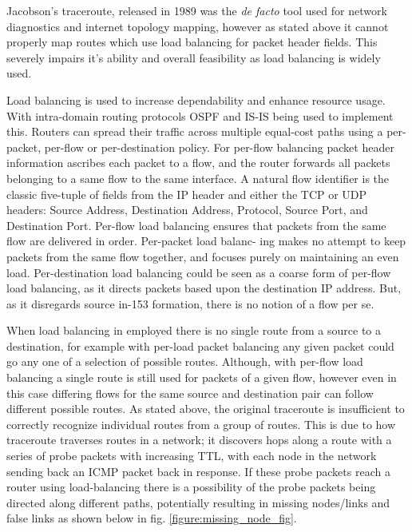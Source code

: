 Jacobson's traceroute, released in 1989 was the \textit{de facto} tool used for network diagnostics and internet topology mapping, however as stated above it cannot properly map routes which use load balancing for packet header fields. This severely impairs it's ability and overall feasibility as load balancing is widely used.

Load balancing is used to increase dependability and enhance resource usage. With intra-domain routing protocols OSPF\cite{moyospf} and IS-IS\cite{isis} being used to implement this. Routers can spread their traffic across multiple equal-cost paths using a per-packet, per-flow or per-destination policy. \cite{cisco}\cite{juniper} For per-flow balancing packet header information ascribes each packet to a flow, and the router forwards all packets belonging to a same flow to the same interface. A natural flow identifier is the classic five-tuple of fields from
the IP header and either the TCP or UDP headers: Source
Address, Destination Address, Protocol, Source Port, and
Destination Port. Per-flow load balancing ensures that packets from the same flow are delivered in order. Per-packet load balanc- ing makes no attempt to keep packets from the same flow together, and focuses purely on maintaining an even load.
Per-destination load balancing could be seen as a coarse form of per-flow load balancing, as it directs packets based upon the destination IP address. But, as it disregards source in-153
formation, there is no notion of a flow per se.\cite{anomalies}

When load balancing in employed there is no single route from a source to a destination, for example with per-load packet balancing any given packet could go any one of a selection of possible routes. Although, with per-flow load balancing a single route is still used for packets of a given flow, however even in this case differing flows for the same source and destination pair can follow different possible routes. 
As stated above, the original traceroute is insufficient to correctly recognize individual routes from a group of routes. This is due to how traceroute traverses routes in a network; it discovers hops along a route with a series of probe packets with increasing TTL, with each node in the network sending back an ICMP packet back in response. If these probe packets reach a router using load-balancing there is a possibility of the probe packets being directed along different paths, potentially resulting in missing nodes/links and false links as shown below in fig. \ref{figure:missing_node_fig}.


